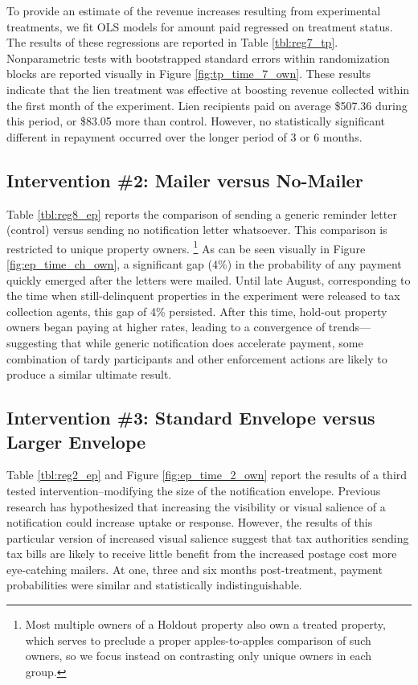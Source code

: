 \documentclass[12pt,titlepage]{article}
\begin{document}
To provide an estimate of the revenue increases resulting from experimental 
treatments, we fit OLS models for amount paid regressed on treatment status.
The results of these regressions are reported in 
Table \ref{tbl:reg7_tp}. Nonparametric tests with bootstrapped standard errors within 
randomization blocks are reported visually in Figure \ref{fig:tp_time_7_own}. 
These results indicate that the lien treatment was effective at boosting 
revenue collected within the first month of the experiment. Lien recipients 
paid on average \$507.36 during this period, or \$83.05 more than control. However, no statistically 
significant different in repayment occurred over the longer period of 3 or 6 months.


\subsection{Intervention \#2: Mailer versus No-Mailer}

Table \ref{tbl:reg8_ep} reports the comparison of sending a generic reminder letter 
(control) versus sending no notification letter whatsoever. This 
comparison is restricted to unique property owners.
\footnote{
	Most multiple owners of a Holdout property also own a treated property, which
	serves to preclude a proper apples-to-apples comparison of such owners, so
	we focus instead on contrasting only unique owners in each group.
}
As can be seen visually in Figure \ref{fig:ep_time_ch_own}, 
a significant gap (4\%) in the probability 
of any payment quickly emerged after the letters were mailed. Until 
late August, corresponding to the time when still-delinquent properties 
in the experiment were released to tax collection agents, this gap of 
4\% persisted. After this time, hold-out property owners began paying 
at higher rates, leading to a convergence of trends—suggesting that 
while generic notification does accelerate payment, some
combination of tardy participants and other enforcement actions are 
likely to produce a similar ultimate result. 

\subsection{Intervention \#3: Standard Envelope versus Larger Envelope}

Table \ref{tbl:reg2_ep} and Figure \ref{fig:ep_time_2_own} 
report the results of a third tested
intervention--modifying the size of the notification envelope.
Previous research has hypothesized that increasing the visibility or visual 
salience of a notification could increase uptake or response.
However, the results of this particular version of increased visual salience 
suggest that tax authorities sending tax bills are likely to receive little 
benefit from the increased postage cost more eye-catching mailers. 
At one, three and six months post-treatment, payment probabilities 
were similar and statistically indistinguishable. 
\end{document}
